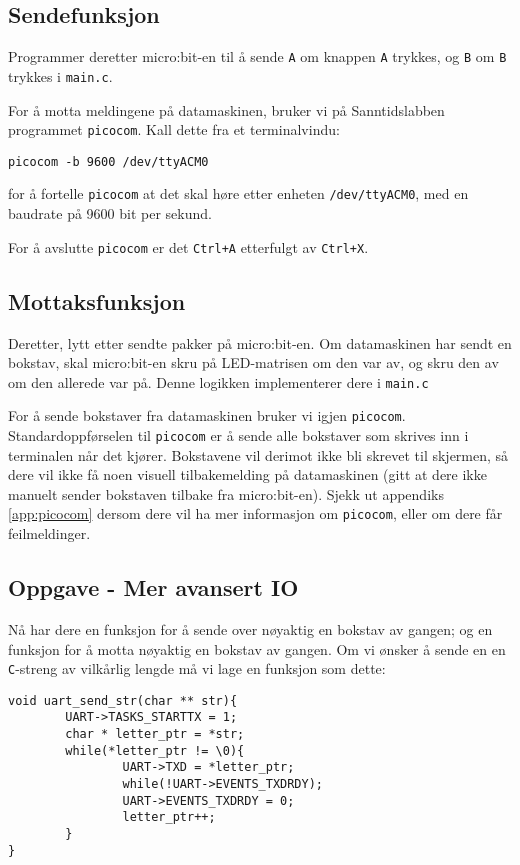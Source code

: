 \subsection{Sendefunksjon}
Programmer deretter micro:bit-en til å sende \verb|A| om knappen \verb|A| trykkes, og \verb|B| om \verb|B| trykkes i \verb|main.c|.

For å motta meldingene på datamaskinen, bruker vi på Sanntidslabben programmet \verb|picocom|. Kall dette fra et terminalvindu:

\verb|picocom -b 9600 /dev/ttyACM0|

for å fortelle \verb|picocom| at det skal høre etter enheten \verb|/dev/ttyACM0|, med en baudrate på 9600 bit per sekund.

For å avslutte \verb|picocom| er det \verb|Ctrl+A| etterfulgt av \verb|Ctrl+X|.

\subsection{Mottaksfunksjon}
Deretter, lytt etter sendte pakker på micro:bit-en. Om datamaskinen har sendt en bokstav, skal micro:bit-en skru på LED-matrisen om den var av, og skru den av om den allerede var på. Denne logikken implementerer dere i \verb|main.c|

For å sende bokstaver fra datamaskinen bruker vi igjen \verb|picocom|. Standardoppførselen til \verb|picocom| er å sende alle bokstaver som skrives inn i terminalen når det kjører. Bokstavene vil derimot ikke bli skrevet til skjermen, så dere vil ikke få noen visuell tilbakemelding på datamaskinen (gitt at dere ikke manuelt sender bokstaven tilbake fra micro:bit-en). Sjekk ut appendiks \ref{app:picocom} dersom dere vil ha mer informasjon om \verb|picocom|, eller om dere får feilmeldinger.


\subsection{Oppgave - Mer avansert IO}

Nå har dere en funksjon for å sende over nøyaktig en bokstav av gangen; og en funksjon for å motta nøyaktig en bokstav av gangen. Om vi ønsker å sende en en \verb|C|-streng av vilkårlig lengde må vi lage en funksjon som dette:

\begin{lstlisting}
void uart_send_str(char ** str){
        UART->TASKS_STARTTX = 1;
        char * letter_ptr = *str;
        while(*letter_ptr != \0){
                UART->TXD = *letter_ptr;
                while(!UART->EVENTS_TXDRDY);
                UART->EVENTS_TXDRDY = 0;
                letter_ptr++;
        }
}
\end{lstlisting}


